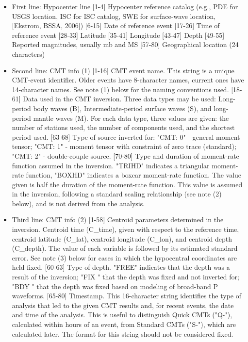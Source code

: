 \begin{itemize}
\item
First line: Hypocenter line
[1-4]   Hypocenter reference catalog (e.g., PDE for USGS location, ISC for
        ISC catalog, SWE for surface-wave location, [Ekstrom, BSSA, 2006])
[6-15]  Date of reference event
[17-26] Time of reference event
[28-33] Latitude
[35-41] Longitude
[43-47] Depth
[49-55] Reported magnitudes, usually mb and MS
[57-80] Geographical location (24 characters)

\item
Second line: CMT info (1)
[1-16]  CMT event name. This string is a unique CMT-event identifier. Older
        events have 8-character names, current ones have 14-character names.
        See note (1) below for the naming conventions used.
[18-61] Data used in the CMT inversion. Three data types may be used: 
        Long-period body waves (B), Intermediate-period surface waves (S),
        and long-period mantle waves (M). For each data type, three values
        are given: the number of stations used, the number of components 
        used, and the shortest period used.
[63-68] Type of source inverted for: "CMT: 0" - general moment tensor; 
        "CMT: 1" - moment tensor with constraint of zero trace (standard); 
        "CMT: 2" - double-couple source.
[70-80] Type and duration of moment-rate function assumed in the inversion. 
        "TRIHD" indicates a triangular moment-rate function, "BOXHD" indicates
        a boxcar moment-rate function. The value given is half the duration
        of the moment-rate function. This value is assumed in the inversion,
        following a standard scaling relationship (see note (2) below),
        and is not derived from the analysis.
        
\item
Third line: CMT info (2)
[1-58]  Centroid parameters determined in the inversion. Centroid time ({\python C\_time}), given
        with respect to the reference time, centroid latitude ({\python C\_lat}), 
        centroid longitude ({\python C\_lon}), and centroid depth ({\python C\_depth}). 
        The value of each variable is followed
        by its estimated standard error. See note (3) below for cases in
        which the hypocentral coordinates are held fixed.
[60-63] Type of depth. "FREE" indicates that the depth was a result of the
        inversion; "FIX " that the depth was fixed and not inverted for;
        "BDY " that the depth was fixed based on modeling of broad-band 
        P waveforms.
[65-80] Timestamp. This 16-character string identifies the type of analysis that
        led to the given CMT results and, for recent events, the date and 
        time of the analysis. This is useful to distinguish Quick CMTs ("Q-"), 
        calculated within hours of an event, from Standard CMTs ("S-"), which 
        are calculated later. The format for this string should not be 
        considered fixed.


\end{itemize}
